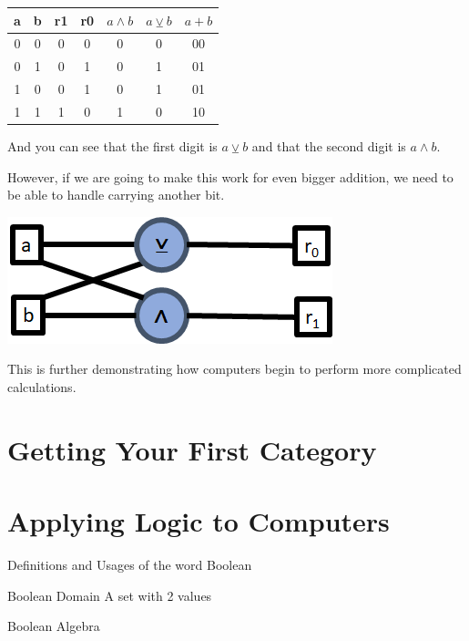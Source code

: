 \begin{table}[ht]
\centering
\begin{tabular}{|c|c|c|c||c|c|c|}
a & b & r1 & r0 & $a\wedge b$ & $a \veebar b$ & $a + b$  \\ \hline
0 & 0 & 0 & 0 & 0 & 0 & 00 \\
0 & 1 & 0 & 1 & 0 & 1 & 01 \\
1 & 0 & 0 & 1 & 0 & 1 & 01 \\
1 & 1 & 1 & 0 & 1 & 0 & 10 
\end{tabular}
\end{table}

And you can see that the first digit is $a \veebar b$ and that the second digit is $a \wedge b$.

However, if we are going to make this work for even bigger addition, we need to be able to handle carrying another bit.


\begin{center}
    \includegraphics{02_LogicConstructions/Pictures/FullAdder.png}
\end{center}

This is further demonstrating how computers begin to perform more complicated calculations.




\section{Getting Your First Category}
\section{Applying Logic to Computers}

\begin{section}{Definitions and Usages of the word Boolean}
    \begin{definition}{Boolean Domain}
        A set with 2 values
    \end{definition}
    \begin{definition}{Boolean Algebra}
    
    \end{definition}

\end{section}
